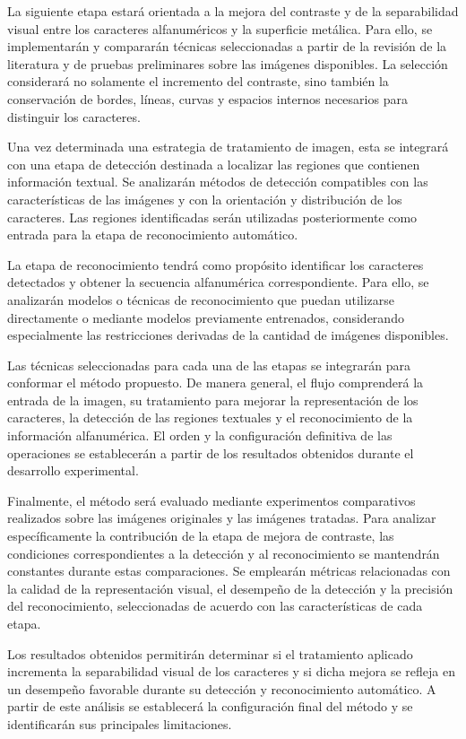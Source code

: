 La siguiente etapa estará orientada a la mejora del contraste y de la separabilidad visual entre los caracteres alfanuméricos y la superficie metálica. Para ello, se implementarán y compararán técnicas seleccionadas a partir de la revisión de la literatura y de pruebas preliminares sobre las imágenes disponibles. La selección considerará no solamente el incremento del contraste, sino también la conservación de bordes, líneas, curvas y espacios internos necesarios para distinguir los caracteres.

Una vez determinada una estrategia de tratamiento de imagen, esta se integrará con una etapa de detección destinada a localizar las regiones que contienen información textual. Se analizarán métodos de detección compatibles con las características de las imágenes y con la orientación y distribución de los caracteres. Las regiones identificadas serán utilizadas posteriormente como entrada para la etapa de reconocimiento automático.

La etapa de reconocimiento tendrá como propósito identificar los caracteres detectados y obtener la secuencia alfanumérica correspondiente. Para ello, se analizarán modelos o técnicas de reconocimiento que puedan utilizarse directamente o mediante modelos previamente entrenados, considerando especialmente las restricciones derivadas de la cantidad de imágenes disponibles.

Las técnicas seleccionadas para cada una de las etapas se integrarán para conformar el método propuesto. De manera general, el flujo comprenderá la entrada de la imagen, su tratamiento para mejorar la representación de los caracteres, la detección de las regiones textuales y el reconocimiento de la información alfanumérica. El orden y la configuración definitiva de las operaciones se establecerán a partir de los resultados obtenidos durante el desarrollo experimental.

Finalmente, el método será evaluado mediante experimentos comparativos realizados sobre las imágenes originales y las imágenes tratadas. Para analizar específicamente la contribución de la etapa de mejora de contraste, las condiciones correspondientes a la detección y al reconocimiento se mantendrán constantes durante estas comparaciones. Se emplearán métricas relacionadas con la calidad de la representación visual, el desempeño de la detección y la precisión del reconocimiento, seleccionadas de acuerdo con las características de cada etapa.

Los resultados obtenidos permitirán determinar si el tratamiento aplicado incrementa la separabilidad visual de los caracteres y si dicha mejora se refleja en un desempeño favorable durante su detección y reconocimiento automático. A partir de este análisis se establecerá la configuración final del método y se identificarán sus principales limitaciones.

